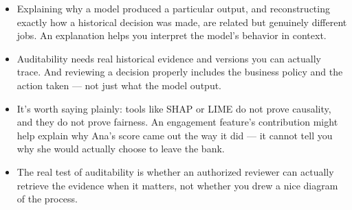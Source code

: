 \documentclass[11pt,a4paper]{article}
\begin{document}
\begin{examplebox}[title after break={SPOKEN SCRIPT --- slide 48 continued}]
\begin{itemize}
\item Explaining why a model produced a particular output, and reconstructing exactly how a historical decision was made, are related but genuinely different jobs. An explanation helps you interpret the model's behavior in context.
\item Auditability needs real historical evidence and versions you can actually trace. And reviewing a decision properly includes the business policy and the action taken — not just what the model output.
\item It's worth saying plainly: tools like SHAP or LIME do not prove causality, and they do not prove fairness. An engagement feature's contribution might help explain why Ana's score came out the way it did — it cannot tell you why she would actually choose to leave the bank.
\item The real test of auditability is whether an authorized reviewer can actually retrieve the evidence when it matters, not whether you drew a nice diagram of the process.
\end{itemize}
\end{examplebox}
\par\noindent{\scriptsize\textcolor{teal!60!black}{Reading anchor: Bass, Ch. 14}}
\clearpage
\end{document}
